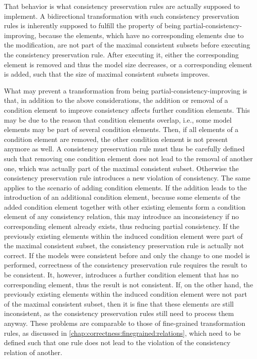 That behavior is what consistency preservation rules are actually supposed to implement.
A bidirectional transformation with such consistency preservation rules is inherently supposed to fulfill the property of being partial-consistency-improving, because the elements, which have no corresponding elements due to the modification, are not part of the maximal consistent subsets before executing the consistency preservation rule.
After executing it, either the corresponding element is removed and thus the model size decreases, or a corresponding element is added, such that the size of maximal consistent subsets improves.

What may prevent a transformation from being partial-consistency-improving is that, in addition to the above considerations, the addition or removal of a condition element to improve consistency affects further condition elements.
This may be due to the reason that condition elements overlap, i.e., some model elements may be part of several condition elements.
Then, if all elements of a condition element are removed, the other condition element is not present anymore as well.
A consistency preservation rule must thus be carefully defined such that removing one condition element does not lead to the removal of another one, which was actually part of the maximal consistent subset.
Otherwise the consistency preservation rule introduces a new violation of consistency.
The same applies to the scenario of adding condition elements. 
If the addition leads to the introduction of an additional condition element, because some elements of the added condition element together with other existing elements form a condition element of any consistency relation, this may introduce an inconsistency if no corresponding element already exists, thus reducing partial consistency.
If the previously existing elements within the induced condition element were part of the maximal consistent subset, the consistency preservation rule is actually not correct.
If the models were consistent before and only the change to one model is performed, correctness of the consistency preservation rule requires the result to be consistent.
It, however, introduces a further condition element that has no corresponding element, thus the result is not consistent.
If, on the other hand, the previously existing elements within the induced condition element were not part of the maximal consistent subset, then it is fine that these elements are still inconsistent, as the consistency preservation rules still need to process them anyway.
These problems are comparable to those of fine-grained transformation rules, as discussed in \autoref{chap:correctness:finegrained:relations}, which need to be defined such that one rule does not lead to the violation of the consistency relation of another.


